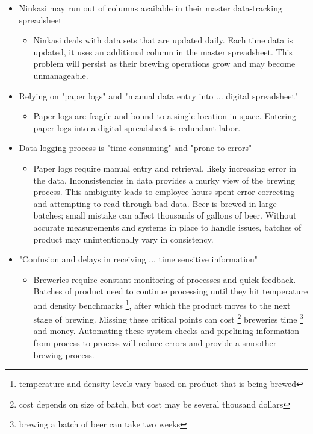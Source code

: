 \documentclass[draftclsnofoot,onecolumn,letterpaper,10pt]{IEEEtran}
\begin{document}
\begin{itemize}

    \item {Ninkasi may run out of columns available in their master data-tracking spreadsheet}
      \begin{itemize}
      \item {Ninkasi deals with data sets that are updated daily. Each time data is updated, it uses an additional column in the master spreadsheet. This problem will persist as their brewing operations grow and may become unmanageable.}
      	\end{itemize}

	\item {Relying on "paper logs" and "manual data entry into ... digital spreadsheet"}
	    \begin{itemize}
			\item {Paper logs are fragile and bound to a single location in space. Entering paper logs into a digital spreadsheet is redundant labor.}
      	    \end{itemize}

	\item {Data logging process is "time consuming" and "prone to errors"}
      		\begin{itemize}
			\item {Paper logs require manual entry and retrieval, likely increasing error in the data. Inconsistencies in data provides a murky view of the brewing process. This ambiguity leads to employee hours spent error correcting and attempting to read through bad data. Beer is brewed in large batches; small mistake can affect thousands of gallons of beer. Without accurate measurements and systems in place to handle issues, batches of product may unintentionally vary in consistency.}
      		\end{itemize}

	\item {"Confusion and delays in receiving ... time sensitive information"}
      		\begin{itemize}
			\item {Breweries require constant monitoring of processes and quick feedback. Batches of product need to continue processing until they hit temperature and density benchmarks \footnote{temperature and density levels vary based on product that is being brewed}, after which the product moves to the next stage of brewing. Missing these critical points can cost \footnote{cost depends on size of batch, but cost may be several thousand dollars} breweries time \footnote{brewing a batch of beer can take two weeks} and money. Automating these system checks and pipelining information from process to process will reduce errors and provide a smoother brewing process.}
      		\end{itemize}


\end{itemize}
\end{document}
